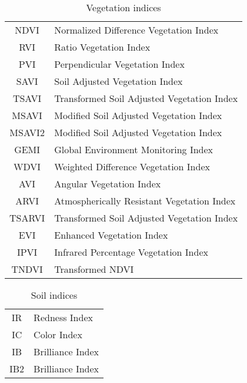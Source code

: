 \begin{table}[htb]
\centering
\begin{tabular}{|c|l|}
\hline
NDVI &  Normalized Difference Vegetation Index \cite{Rouse1973-NDVI} \\
RVI &  Ratio Vegetation Index \cite{Pearson1972-RVI}\\
PVI & Perpendicular Vegetation Index \cite{Richardson1977-PVI,Wiegand1991-PVI}\\ 
SAVI & Soil Adjusted Vegetation Index \cite{Huete1988-SAVI} \\
TSAVI & Transformed Soil Adjusted Vegetation Index \cite{Baret1989-TSAVI,Baret1991-TSAVI} \\
MSAVI & Modified Soil Adjusted Vegetation Index  \cite{Qi1994-MSAVI} \\
MSAVI2 & Modified Soil Adjusted Vegetation Index  \cite{Qi1994-MSAVI} \\
GEMI &   Global Environment Monitoring Index \cite{Pinty1992-GEMI} \\
WDVI & Weighted Difference Vegetation Index  \cite{Clevers1988-WDVI,Clevers1991-WDVI} \\ 
AVI & Angular Vegetation Index  \cite{AVI}\\
ARVI & Atmospherically Resistant  Vegetation Index \cite{ARVI} \\
TSARVI & Transformed Soil Adjusted Vegetation Index   \cite{ARVI} \\
EVI & Enhanced Vegetation Index \cite{Huete1994-EVI,Justice1998-EVI} \\
IPVI & Infrared Percentage Vegetation Index  \cite{Crippen1990-IPVI} \\
TNDVI & Transformed NDVI  \cite{Deering1975-TNDVI} \\
\hline
\end{tabular}
\caption{Vegetation indices}\label{tab:vegetationindices}
\end{table}

\begin{table}[htb]
\centering
\begin{tabular}{|c|l|}
\hline
IR  & Redness Index  \cite{Pouget1990-IRIC} \\
IC  & Color Index  \cite{Pouget1990-IRIC} \\
IB  & Brilliance Index  \cite{Nicoloyanni1990-IB} \\
IB2 & Brilliance Index  \cite{Nicoloyanni1990-IB} \\
\hline
\end{tabular}
\caption{Soil indices}\label{tab:soilindices}
\end{table}

